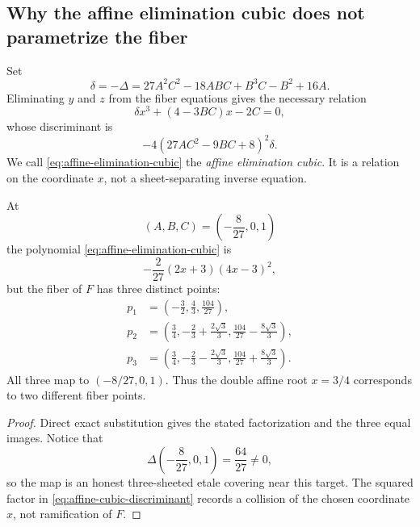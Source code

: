 \subsection{Why the affine elimination cubic does not parametrize the fiber}

\begin{definition}\label{def:affine-elimination-cubic}
Set
\[
  \delta=-\Delta
  =27A^2C^2-18ABC+B^3C-B^2+16A.
\]
Eliminating $y$ and $z$ from the fiber equations gives the necessary relation
\begin{equation}\label{eq:affine-elimination-cubic}
  \delta x^3+(4-3BC)x-2C=0,
\end{equation}
whose discriminant is
\begin{equation}\label{eq:affine-cubic-discriminant}
  -4(27AC^2-9BC+8)^2\delta.
\end{equation}
We call \eqref{eq:affine-elimination-cubic} the \emph{affine elimination cubic}.  It is a relation on the coordinate $x$, not a sheet-separating inverse equation.
\end{definition}

\begin{proposition}\label{prop:affine-coordinate-collision}
At
\[
  (A,B,C)=\left(-\frac8{27},0,1\right)
\]
the polynomial \eqref{eq:affine-elimination-cubic} is
\[
  -\frac2{27}(2x+3)(4x-3)^2,
\]
but the fiber of $F$ has three distinct points:
\[
\begin{aligned}
 p_1&=\left(-\frac32,\frac43,\frac{104}{27}\right),\\
 p_2&=\left(\frac34,-\frac23+\frac{2\sqrt3}{3},
                  \frac{104}{27}-\frac{8\sqrt3}{3}\right),\\
 p_3&=\left(\frac34,-\frac23-\frac{2\sqrt3}{3},
                  \frac{104}{27}+\frac{8\sqrt3}{3}\right).
\end{aligned}
\]
All three map to $(-8/27,0,1)$.  Thus the double affine root $x=3/4$ corresponds to two different fiber points.
\end{proposition}

\begin{proof}
Direct exact substitution gives the stated factorization and the three equal images.  Notice that
\[
  \Delta\left(-\frac8{27},0,1\right)=\frac{64}{27}\neq0,
\]
so the map is an honest three-sheeted etale covering near this target.  The squared factor in \eqref{eq:affine-cubic-discriminant} records a collision of the chosen coordinate $x$, not ramification of $F$.
\end{proof}

